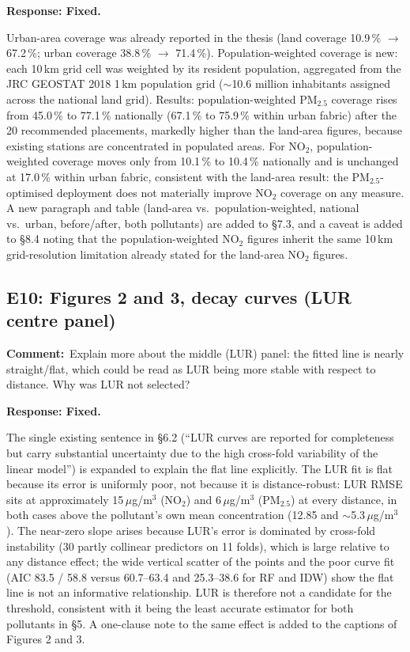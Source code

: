 \documentclass[11pt,a4paper]{article}
\newcommand{\rjcomment}[1]{\par\noindent\textbf{Comment:}\ #1\par}
\newcommand{\rjresponse}[1]{\par\noindent\textbf{Response: #1}\par}
\begin{document}
\rjresponse{Fixed.}
Urban-area coverage was already reported in the thesis (land coverage 10.9\,\% $\rightarrow$
67.2\,\%; urban coverage 38.8\,\% $\rightarrow$ 71.4\,\%). Population-weighted coverage is new:
each 10\,km grid cell was weighted by its resident population, aggregated from the JRC GEOSTAT
2018 1\,km population grid ($\sim$10.6 million inhabitants assigned across the national land
grid). Results: population-weighted PM$_{2.5}$
coverage rises from 45.0\,\% to 77.1\,\% nationally (67.1\,\% to 75.9\,\% within urban fabric)
after the 20 recommended placements, markedly higher than the land-area figures, because
existing stations are concentrated in populated areas. For NO$_2$, population-weighted coverage
moves only from 10.1\,\% to 10.4\,\% nationally and is unchanged at 17.0\,\% within urban fabric,
consistent with the land-area result: the PM$_{2.5}$-optimised deployment does not materially
improve NO$_2$ coverage on any measure. A new paragraph and table (land-area vs.\
population-weighted, national vs.\ urban, before/after, both pollutants) are added to \S7.3, and
a caveat is added to \S8.4 noting that the population-weighted NO$_2$ figures inherit the same
10\,km grid-resolution limitation already stated for the land-area NO$_2$ figures.

\subsection{E10: Figures 2 and 3, decay curves (LUR centre panel)}

\rjcomment{Explain more about the middle (LUR) panel: the fitted line is nearly straight/flat,
which could be read as LUR being more stable with respect to distance. Why was LUR not
selected?}

\rjresponse{Fixed.}
The single existing sentence in \S6.2 (``LUR curves are reported for completeness but carry
substantial uncertainty due to the high cross-fold variability of the linear model'') is
expanded to explain the flat line explicitly. The LUR fit is flat because its error is uniformly
poor, not because it is distance-robust: LUR RMSE sits at approximately 15\,$\mu$g/m$^3$
(NO$_2$) and 6\,$\mu$g/m$^3$ (PM$_{2.5}$) at every distance, in both cases above the pollutant's
own mean concentration (12.85 and $\sim$5.3\,$\mu$g/m$^3$). The near-zero slope arises because
LUR's error is dominated by cross-fold instability (30 partly collinear predictors on 11 folds),
which is large relative to any distance effect; the wide vertical scatter of the points and the
poor curve fit (AIC 83.5 / 58.8 versus 60.7--63.4 and 25.3--38.6 for RF and IDW) show the flat
line is not an informative relationship. LUR is therefore not a candidate for the threshold,
consistent with it being the least accurate estimator for both pollutants in \S5. A one-clause
note to the same effect is added to the captions of Figures 2 and 3.
\end{document}
